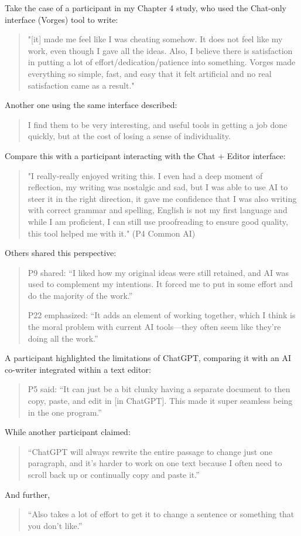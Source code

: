 Take the case of a participant in my Chapter 4 study, who used the Chat-only interface (Vorges) tool to write:
\begin{quote}
"[it] made me feel like I was cheating somehow. It does not feel like my work, even though I gave all the ideas. Also, I believe there is satisfaction in putting a lot of effort/dedication/patience into something. Vorges made everything so simple, fast, and easy that it felt artificial and no real satisfaction came as a result."
\end{quote}
Another one using the same interface described:
\begin{quote}
I find them to be very interesting, and useful tools in getting a job done quickly, but at the cost of losing a sense of individuality.
\end{quote}
Compare this with a participant interacting with the Chat + Editor interface:
\begin{quote}
"I really-really enjoyed writing this. I even had a deep moment of reflection, my writing was nostalgic and sad, but I was able to use AI to steer it in the right direction, it gave me confidence that I was also writing with correct grammar and spelling, English is not my first language and while I am proficient, I can still use proofreading to ensure good quality, this tool helped me with it." (P4 Common AI)
\end{quote}
Others shared this perspective:
\begin{quote}
P9 shared: “I liked how my original ideas were still retained, and AI was used to complement my intentions. It forced me to put in some effort and do the majority of the work.”

P22 emphasized: “It adds an element of working together, which I think is the moral problem with current AI tools—they often seem like they’re doing all the work.”
\end{quote}

A participant highlighted the limitations of ChatGPT, comparing it with an AI co-writer integrated within a text editor:
\begin{quote}
P5 said: “It can just be a bit clunky having a separate document to then copy, paste, and edit in [in ChatGPT]. This made it super seamless being in the one program.”
\end{quote}
While another participant claimed:
\begin{quote}
“ChatGPT will always rewrite the entire passage to change just one paragraph, and it’s harder to work on one text because I often need to scroll back up or continually copy and paste it.”
\end{quote}
And further,
\begin{quote}
“Also takes a lot of effort to get it to change a sentence or something that you don't like.”
\end{quote}

